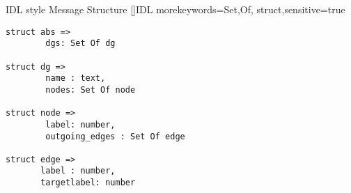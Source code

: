 \begin{frame}[fragile]{IDL style Message Structure}
[]{IDL}
{morekeywords={Set,Of, struct},sensitive=true}
\begin{lstlisting}[basicstyle=\footnotesize,keywordstyle={\ttfamily\color{green}\bfseries},language=myIDL]
struct abs => 
        dgs: Set Of dg

struct dg => 
        name : text,
        nodes: Set Of node

struct node => 
        label: number,
        outgoing_edges : Set Of edge

struct edge => 
       label : number,
       targetlabel: number
\end{lstlisting}

\end{frame}




